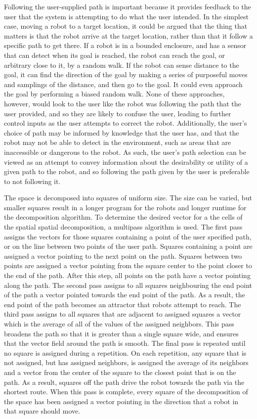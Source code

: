 Following the user-supplied path is important because it provides feedback to the user that the system is attempting to do what the user intended. 
In the simplest case, moving a robot to a target location, it could be argued that the thing that matters is that the robot arrive at the target location, rather than that it follow a specific path to get there. 
If a robot is in a bounded enclosure, and has a sensor that can detect when its goal is reached, the robot can reach the goal, or arbitrary close to it, by a random walk. 
If the robot can sense distance to the goal, it can find the direction of the goal by making a series of purposeful moves and samplings of the distance, and then go to the goal.
It could even approach the goal by performing a biased random walk. 
None of these approaches, however, would look to the user like the robot was following the path that the user provided, and so they are likely to confuse the user, leading to further control inputs as the user attempts to correct the robot. 
Additionally, the user's choice of path may be informed by knowledge that the user has, and that the robot may not be able to detect in the environment, such as areas that are inaccessible or dangerous to the robot. 
As such, the user's path selection can be viewed as an attempt to convey information about the desirability or utility of a given path to the robot, and so following the path given by the user is preferable to not following it. 

The space is decomposed into squares of uniform size. The size can be varied, but smaller squares result in a longer program for the robots and longer runtime for the decomposition algorithm. 
To determine the desired vector for a the cells of the spatial spatial decomposition, a multipass algorithm is used. 
The first pass assigns the vectors for those squares containing a point of the user specified path, or on the line between two points of the user path. 
Squares containing a point are assigned a vector pointing to the next point on the path. 
Squares between two points are assigned a vector pointing from the square center to the point closer to the end of the path. 
After this step, all points on the path have a vector pointing along the path. 
The second pass assigns to all squares neighbouring the end point of the path a vector pointed towards the end point of the path. 
As a result, the end point of the path becomes an attractor that robots attempt to reach. 
The third pass assigns to all squares that are adjacent to assigned squares a vector which is the average of all of the values of the assigned neighbors. 
This pass broadens the path so that it is greater than a single square wide, and ensures that the vector field around the path is smooth. 
The final pass is repeated until no square is assigned during a repetition. 
On each repetition, any square that is not assigned, but has assigned neighbors, is assigned the average of its neighbors and a vector from the center of the square to the closest point that is on the path. 
As a result, squares off the path drive the robot towards the path via the shortest route. 
When this pass is complete, every square of the decomposition of the space has been assigned a vector pointing in the direction that a robot in that square should move. 


